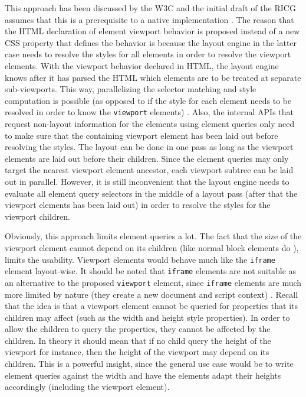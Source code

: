 \documentclass[a4paper,11pt]{kth-mag}
\newcommand{\code}[1]{\texttt{#1}}
\begin{document}
      This approach has been discussed by the \gls{W3C} and the initial draft of the \gls{RICG} assumes that this is a prerequisite to a \gls{native} implementation \cite{w3c_eq_mail,ricg_irc_log}.
      The reason that the \gls{HTML} declaration of element viewport behavior is proposed instead of a new \gls{CSS} property that defines the behavior is because the \gls{layout engine} in the latter case needs to resolve the styles for all \glspl{element} in order to resolve the viewport \glspl{element}.
      With the viewport behavior declared in \gls{HTML}, the \gls{layout engine} knows after it has parsed the \gls{HTML} which \glspl{element} are to be treated at separate sub-viewports.
      This way, parallelizing the selector matching and style computation is possible (as opposed to if the style for each element needs to be resolved in order to know the \code{viewport} \glspl{element}) \cite{w3c_eq_mail}.
      Also, the internal \glspl{API} that request non-layout information for the \glspl{element} using element queries only need to make sure that the containing \gls{viewport} \gls{element} has been laid out before resolving the styles.
      The layout can be done in one pass as long as the \gls{viewport} \glspl{element} are laid out before their children.
      Since the element queries may only target the nearest \gls{viewport} \gls{element} ancestor, each \gls{viewport} subtree can be laid out in parallel.
      However, it is still inconvenient that the \gls{layout engine} needs to evaluate all element query selectors in the middle of a layout pass (after that the \gls{viewport} \glspl{element} has been laid out) in order to resolve the styles for the \gls{viewport} children.

      Obviously, this approach limits element queries a lot.
      The fact that the size of the \gls{viewport} \gls{element} cannot depend on its children (like normal block \glspl{element} do \cite{w3c_css21}), limits the usability.
      Viewport \glspl{element} would behave much like the \code{iframe} \gls{element} layout-wise.
      It should be noted that \code{iframe} \glspl{element} are not suitable as an alternative to the proposed \code{viewport} \gls{element}, since \code{iframe} elements are much more limited by nature (they create a new \gls{document} and script context) \cite{w3c_css21}.
      Recall that the idea is that a viewport element cannot be queried for properties that its children may affect (such as the width and height style properties).
      In order to allow the children to query the properties, they cannot be affected by the children.
      In theory it should mean that if no child query the height of the viewport for instance, then the height of the viewport may depend on its children.
      This is a powerful insight, since the general use case would be to write element queries against the width and have the \glspl{element} adapt their heights accordingly (including the viewport \gls{element}).
\end{document}
